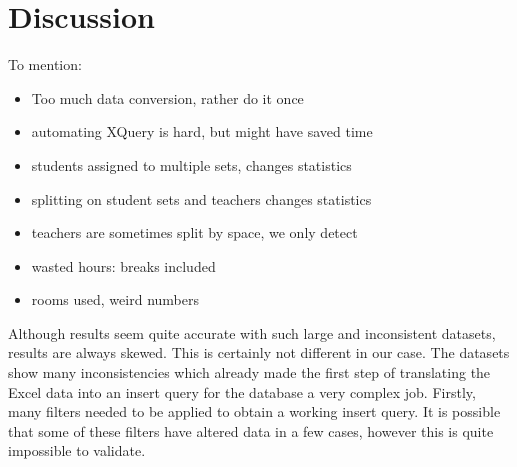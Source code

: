 \section{Discussion}
To mention:
\begin{itemize}
	\item Too much data conversion, rather do it once
	\item automating XQuery is hard, but might have saved time	
	\item students assigned to multiple sets, changes statistics
	\item splitting on student sets and teachers changes statistics
	\item teachers are sometimes split by space, we only detect \code{;}
	\item wasted hours: breaks included
	\item rooms used, weird numbers
\end{itemize}

Although results seem quite accurate with such large and inconsistent datasets, results are always skewed. This is certainly not different in our case. The datasets show many inconsistencies which already made the first step of translating the Excel data into an insert query for the database a very complex job. Firstly, many filters needed to be applied to obtain a working insert query. It is possible that some of these filters have altered data in a few cases, however this is quite impossible to validate.

